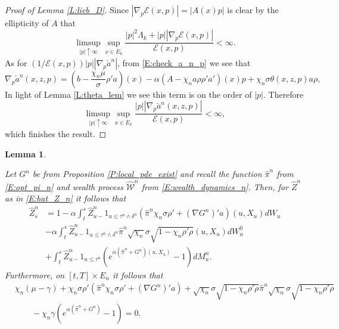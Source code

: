 \documentclass[11pt, letterpaper]{amsart}
\newtheorem{lemma}[theorem]{Lemma}
\theoremstyle{definition}
\theoremstyle{remark}
\numberwithin{equation}{section}
\newcommand{\We}{\mathcal{W}}
\newcommand{\hwe}{\hat{\We}}
\newcommand{\hz}{\hat{Z}}
\newcommand{\hpi}{\hat{\pi}}
\newcommand{\EN}{\mathcal{E}}
\newcommand{\ol}[1]{\overline{#1}}
\begin{document}
\begin{proof}[Proof of Lemma \ref{L:lieb_D}]
Since $|\nabla_p\EN(x,p)| = |A(x)p|$ is clear by the ellipticity of $A$ that
\begin{equation*}
\limsup_{|p|\uparrow\infty}\sup_{x\in\ol{E}_k} \frac{|p|^2\Lambda_k + |p||\nabla_p\EN(x,p)|}{\EN(x,p)} < \infty.
\end{equation*}
As for $(1/\EN(x,p))|p||\nabla_p\check{a}^n|$, from \eqref{E:check_a_n_p} we see that
\begin{equation*}
\nabla_p\check{a}^n(x,z,p) = \left(b-\frac{\chi_n\mu}{\sigma}\rho'a\right)(x)-\alpha \left(A-\chi_n a\rho\rho'a'\right)(x)p + \chi_n\sigma \theta(x,z,p)a\rho,
\end{equation*}
In light of Lemma \ref{L:theta_lem} we see this term is on the order of $|p|$. Therefore
\begin{equation*}
\limsup_{|p|\uparrow\infty}\sup_{x\in\ol{E}_k} \frac{|p||\nabla_p\check{a}^n(x,z,p)|}{\EN(x,p)} < \infty,
\end{equation*}
which finishes the result.
\end{proof}


\begin{lemma}\label{L:ITO_result}

Let $G^n$ be from Proposition \ref{P:local_pde_exist} and recall the function $\hpi^n$ from \eqref{E:opt_pi_n} and wealth process $\hwe^n$ from \eqref{E:wealth_dynamics_n}. Then, for $\hz^n$ as in \eqref{E:hat_Z_n} it follows that
\begin{equation*}
\begin{split}
\hz^n_s &= 1 -\alpha\int_t^s \hz^n_{u-}1_{u\leq\tau^n\wedge\delta^n}\left(\hpi^n\chi_n\sigma \rho' + (\nabla G^n)'a\right)(u,X_u)dW_u\\
&-\alpha\int_t^s \hz^n_{u-} 1_{u\leq\tau^n\wedge\delta^n}\hpi^n\sqrt{\chi_n}\sigma\sqrt{1-\chi_n\rho'\rho}(u,X_u)dW^0_u\\
&+ \int_t^s \hz^n_{u-}1_{u\leq\tau^n}\left(e^{\alpha\left(\hpi^n + G^n\right)(u,X_u)}-1\right)dM^n_u.
\end{split}
\end{equation*}
Furthermore, on $[t,T]\times E_n$ it follows that
\begin{equation}\label{E:functional_mkt_px_of_risk_n}
\begin{split}
&\chi_n(\mu-\gamma) + \chi_n\sigma\rho'\left(\hpi^n\chi_n\sigma \rho' + (\nabla G^n)'a\right) + \sqrt{\chi_n}\sigma\sqrt{1-\chi_n\rho'\rho}\hpi^n\sqrt{\chi_n}\sigma\sqrt{1-\chi_n\rho'\rho}\\
&\qquad   - \chi_n\gamma\left(e^{\alpha\left(\hpi^n + G^n\right)}-1\right) = 0.
\end{split}
\end{equation}

\end{lemma}
\end{document}
